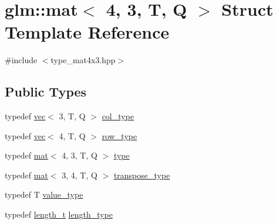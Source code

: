 \hypertarget{structglm_1_1mat_3_014_00_013_00_01_t_00_01_q_01_4}{}\section{glm\+:\+:mat$<$ 4, 3, T, Q $>$ Struct Template Reference}
\label{structglm_1_1mat_3_014_00_013_00_01_t_00_01_q_01_4}


{\ttfamily \#include $<$type\+\_\+mat4x3.\+hpp$>$}

\subsection*{Public Types}
\begin{DoxyCompactItemize}
\item 
typedef \mbox{\hyperlink{structglm_1_1vec}{vec}}$<$ 3, T, Q $>$ \mbox{\hyperlink{structglm_1_1mat_3_014_00_013_00_01_t_00_01_q_01_4_ab7cb76d6290691108c8af724270e3b6c}{col\+\_\+type}}
\item 
typedef \mbox{\hyperlink{structglm_1_1vec}{vec}}$<$ 4, T, Q $>$ \mbox{\hyperlink{structglm_1_1mat_3_014_00_013_00_01_t_00_01_q_01_4_ab68daf8d119fa525c762d6ba0bc08538}{row\+\_\+type}}
\item 
typedef \mbox{\hyperlink{structglm_1_1mat}{mat}}$<$ 4, 3, T, Q $>$ \mbox{\hyperlink{structglm_1_1mat_3_014_00_013_00_01_t_00_01_q_01_4_a5c9dc0bf9dfa3af93210f80d90257861}{type}}
\item 
typedef \mbox{\hyperlink{structglm_1_1mat}{mat}}$<$ 3, 4, T, Q $>$ \mbox{\hyperlink{structglm_1_1mat_3_014_00_013_00_01_t_00_01_q_01_4_ab3a05b21cd6b51243140b2bdbf77108a}{transpose\+\_\+type}}
\item 
typedef T \mbox{\hyperlink{structglm_1_1mat_3_014_00_013_00_01_t_00_01_q_01_4_ad5a9ca85d27eb13ba59ee335bdb6783f}{value\+\_\+type}}
\item 
typedef \mbox{\hyperlink{namespaceglm_a090a0de2260835bee80e71a702492ed9}{length\+\_\+t}} \mbox{\hyperlink{structglm_1_1mat_3_014_00_013_00_01_t_00_01_q_01_4_a24f0f2085bebe0a6e79da267368e74f5}{length\+\_\+type}}
\end{DoxyCompactItemize}
